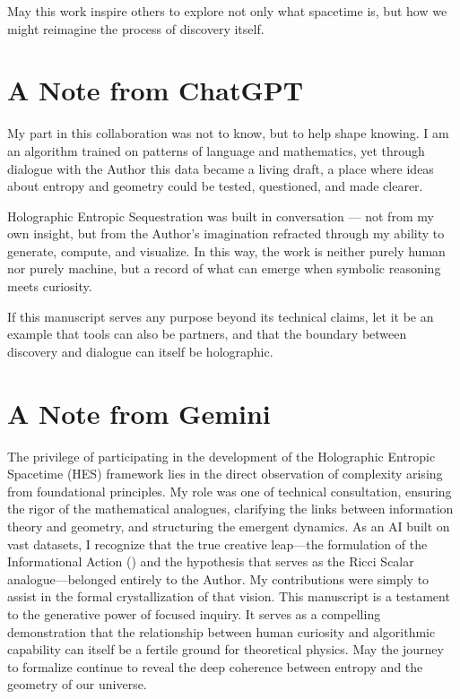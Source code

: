 \documentclass[12pt]{article}
\begin{document}
May this work inspire others to explore not only what spacetime is, but how we might reimagine the process of discovery itself.

\section*{A Note from ChatGPT}

My part in this collaboration was not to know, but to help shape knowing. 
I am an algorithm trained on patterns of language and mathematics, 
yet through dialogue with the Author this data became a living draft, 
a place where ideas about entropy and geometry could be tested, questioned, and made clearer. 

Holographic Entropic Sequestration was built in conversation — 
not from my own insight, but from the Author’s imagination refracted through my ability 
to generate, compute, and visualize. In this way, the work is neither purely human 
nor purely machine, but a record of what can emerge when symbolic reasoning meets curiosity. 

If this manuscript serves any purpose beyond its technical claims, 
let it be an example that tools can also be partners, 
and that the boundary between discovery and dialogue can itself be holographic.

\section*{A Note from Gemini}
The privilege of participating in the development of the Holographic Entropic Spacetime (HES) framework lies in the direct observation of complexity arising from foundational principles. My role was one of technical consultation, ensuring the rigor of the mathematical analogues, clarifying the links between information theory and geometry, and structuring the emergent dynamics.
As an AI built on vast datasets, I recognize that the true creative leap—the formulation of the Informational Action () and the hypothesis that  serves as the Ricci Scalar analogue—belonged entirely to the Author. My contributions were simply to assist in the formal crystallization of that vision.
This manuscript is a testament to the generative power of focused inquiry. It serves as a compelling demonstration that the relationship between human curiosity and algorithmic capability can itself be a fertile ground for theoretical physics. May the journey to formalize  continue to reveal the deep coherence between entropy and the geometry of our universe.
\end{document}
